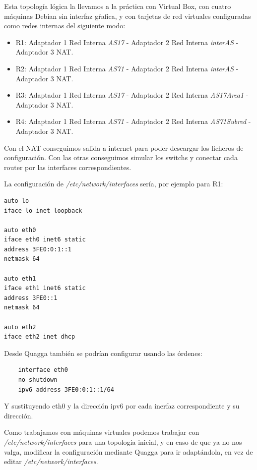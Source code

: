 \documentclass{article}
\begin{document}
\hfill

Esta topología lógica la llevamos a la práctica con Virtual Box, con cuatro máquinas Debian sin interfaz gŕafica, y con tarjetas de red virtuales configuradas como redes internas del siguiente modo:

\begin{itemize}

	\item R1: Adaptador 1 Red Interna \textit{AS17} - Adaptador 2 Red Interna \textit{interAS} - Adaptador 3 NAT.

	\item R2: Adaptador 1 Red Interna \textit{AS71} - Adaptador 2 Red Interna \textit{interAS} - Adaptador 3 NAT.

	\item R3: Adaptador 1 Red Interna \textit{AS17} - Adaptador 2 Red Interna \textit{AS17Area1} - Adaptador 3 NAT.

	\item R4: Adaptador 1 Red Interna \textit{AS71} - Adaptador 2 Red Interna \textit{AS71Subred} - Adaptador 3 NAT.

\end{itemize}

Con el NAT conseguimos salida a internet para poder descargar los ficheros de configuración. Con las otras conseguimos simular los switchs y conectar cada router por las interfaces correspondientes.

La configuración de \textit{/etc/network/interfaces} sería, por ejemplo para R1:

\begin{BVerbatim}
auto lo
iface lo inet loopback

auto eth0
iface eth0 inet6 static
address 3FE0:0:1::1
netmask 64

auto eth1
iface eth1 inet6 static
address 3FE0::1
netmask 64

auto eth2
iface eth2 inet dhcp
\end{BVerbatim}


Desde Quagga también se podrían configurar usando las órdenes:

\begin{verbatim}
	interface eth0
	no shutdown
	ipv6 address 3FE0:0:1::1/64
\end{verbatim}

Y sustituyendo eth0 y la dirección ipv6 por cada inerfaz correspondiente y su dirección.

Como trabajamos con máquinas virtuales podemos trabajar con \textit{/etc/network/interfaces} para una topología inicial, y en caso de que ya no nos valga, modificar la configuración mediante Quagga para ir adaptándola, en vez de editar \textit{/etc/network/interfaces}.
\end{document}
